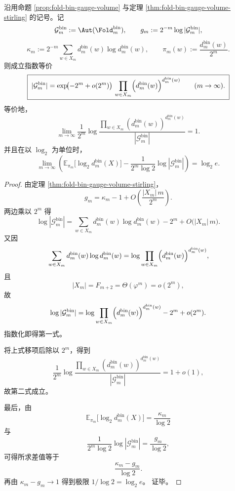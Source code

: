 \begin{theorem}\label{thm:xi-gauge-volume-boltzmann-stirling-exponential}
沿用命题 \ref{prop:fold-bin-gauge-volume} 与定理 \ref{thm:fold-bin-gauge-volume-stirling}
的记号。记
\[
\mathcal G_m^{\mathrm{bin}}:=\Aut(\Fold_m^{\mathrm{bin}}),
\qquad
g_m:=2^{-m}\log|\mathcal G_m^{\mathrm{bin}}|,
\]
\[
\kappa_m:=2^{-m}\sum_{w\in X_m}d_m^{\mathrm{bin}}(w)\log d_m^{\mathrm{bin}}(w),
\qquad
\pi_m(w):=\frac{d_m^{\mathrm{bin}}(w)}{2^m}.
\]
则成立指数等价
\[
\boxed{\;
|\mathcal G_m^{\mathrm{bin}}|
=
\exp\!\bigl(-2^m+o(2^m)\bigr)\,
\prod_{w\in X_m}\Bigl(d_m^{\mathrm{bin}}(w)\Bigr)^{d_m^{\mathrm{bin}}(w)}
\qquad(m\to\infty).\;}
\]
等价地，
\[
\boxed{\;
\lim_{m\to\infty}
\frac{1}{2^m}\log
\frac{\prod_{w\in X_m}(d_m^{\mathrm{bin}}(w))^{d_m^{\mathrm{bin}}(w)}}{|\mathcal G_m^{\mathrm{bin}}|}
=1.\;}
\]
并且在以 \(\log_2\) 为单位时，
\[
\boxed{\;
\lim_{m\to\infty}
\left(
\mathbb E_{\pi_m}\!\bigl[\log_2 d_m^{\mathrm{bin}}(X)\bigr]
-\frac{1}{2^m\log 2}\log|\mathcal G_m^{\mathrm{bin}}|
\right)
=
\log_2 e.\;}
\]
\end{theorem}
\begin{proof}
由定理 \ref{thm:fold-bin-gauge-volume-stirling}，
\[
g_m=\kappa_m-1+O\!\left(\frac{|X_m|\,m}{2^m}\right).
\]
两边乘以 \(2^m\) 得
\[
\log|\mathcal G_m^{\mathrm{bin}}|
=
\sum_{w\in X_m}d_m^{\mathrm{bin}}(w)\log d_m^{\mathrm{bin}}(w)
-2^m
+O\!\bigl(|X_m|\,m\bigr).
\]
又因
\[
\sum_{w\in X_m}d_m^{\mathrm{bin}}(w)\log d_m^{\mathrm{bin}}(w)
=
\log \prod_{w\in X_m}\Bigl(d_m^{\mathrm{bin}}(w)\Bigr)^{d_m^{\mathrm{bin}}(w)},
\]
且
\[
|X_m|=F_{m+2}=\Theta(\varphi^m)=o(2^m),
\]
故
\[
\log|\mathcal G_m^{\mathrm{bin}}|
=
\log \prod_{w\in X_m}\Bigl(d_m^{\mathrm{bin}}(w)\Bigr)^{d_m^{\mathrm{bin}}(w)}
-2^m+o(2^m).
\]
指数化即得第一式。
\par
将上式移项后除以 \(2^m\)，得到
\[
\frac{1}{2^m}\log
\frac{\prod_{w\in X_m}(d_m^{\mathrm{bin}}(w))^{d_m^{\mathrm{bin}}(w)}}{|\mathcal G_m^{\mathrm{bin}}|}
=1+o(1),
\]
故第二式成立。
\par
最后，由
\[
\mathbb E_{\pi_m}\!\bigl[\log_2 d_m^{\mathrm{bin}}(X)\bigr]
=
\frac{\kappa_m}{\log 2}
\]
与
\[
\frac{1}{2^m\log 2}\log|\mathcal G_m^{\mathrm{bin}}|
=
\frac{g_m}{\log 2},
\]
可得所求差值等于
\[
\frac{\kappa_m-g_m}{\log 2}.
\]
再由
\(
\kappa_m-g_m\to 1
\)
得到极限
\(
1/\log 2=\log_2 e
\)。
证毕。
\end{proof}



